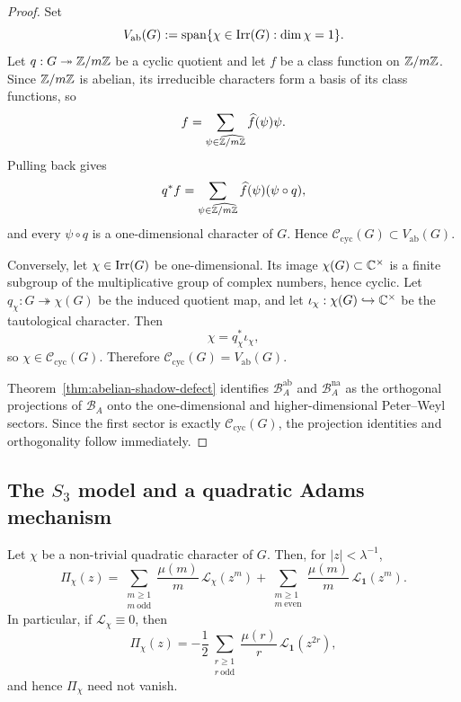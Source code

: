 \begin{proof}
  Set
  \[
    V_{\mathrm{ab}}(G)
    :=
    \operatorname{span}\{\chi\in\operatorname{Irr}(G):\dim\chi=1\}.
  \]
  Let \(q:G\twoheadrightarrow \mathbb{Z}/m\mathbb{Z}\) be a cyclic quotient and let
  \(f\) be a class function on \(\mathbb{Z}/m\mathbb{Z}\). Since \(\mathbb{Z}/m\mathbb{Z}\) is
  abelian, its irreducible characters form a basis of its class
  functions, so
  \[
    f=\sum_{\psi\in\widehat{\mathbb{Z}/m\mathbb{Z}}}\widehat f(\psi)\psi.
  \]
  Pulling back gives
  \[
    q^\ast f
    =
    \sum_{\psi\in\widehat{\mathbb{Z}/m\mathbb{Z}}}
      \widehat f(\psi)(\psi\circ q),
  \]
  and every \(\psi\circ q\) is a one-dimensional character of \(G\).
  Hence \(\mathscr C_{\mathrm{cyc}}(G)\subset V_{\mathrm{ab}}(G)\).

  Conversely, let \(\chi\in\operatorname{Irr}(G)\) be one-dimensional. Its image
  \(\chi(G)\subset\mathbb{C}^\times\) is a finite subgroup of the
  multiplicative group of complex numbers, hence cyclic. Let
  \(q_\chi:G\twoheadrightarrow \chi(G)\) be the induced quotient map,
  and let \(\iota_\chi:\chi(G)\hookrightarrow \mathbb{C}^\times\) be the
  tautological character. Then
  \[
    \chi=q_\chi^\ast\iota_\chi,
  \]
  so \(\chi\in\mathscr C_{\mathrm{cyc}}(G)\). Therefore
  \(\mathscr C_{\mathrm{cyc}}(G)=V_{\mathrm{ab}}(G)\).

  Theorem~\ref{thm:abelian-shadow-defect} identifies
  \(\mathcal B_A^{\mathrm{ab}}\) and \(\mathcal B_A^{\mathrm{na}}\) as
  the orthogonal projections of \(\mathcal B_A\) onto the
  one-dimensional and higher-dimensional Peter--Weyl sectors. Since the
  first sector is exactly \(\mathscr C_{\mathrm{cyc}}(G)\), the
  projection identities and orthogonality follow immediately.
\end{proof}

\subsection{The \texorpdfstring{$S_3$}{S3} model and a quadratic Adams mechanism}

\begin{proposition}
  \label{thm:quadratic-adams-obstruction}
  Let \(\chi\) be a non-trivial quadratic character of \(G\). Then, for
  \(|z|<\lambda^{-1}\),
  \begin{equation}\label{eq:quadratic-adams-obstruction}
    \Pi_\chi(z)
    =
    \sum_{\substack{m\ge 1\\ m\ \mathrm{odd}}}
      \frac{\mu(m)}{m}\,\mathcal L_\chi(z^m)
    +
    \sum_{\substack{m\ge 1\\ m\ \mathrm{even}}}
      \frac{\mu(m)}{m}\,\mathcal L_{\mathbf 1}(z^m).
  \end{equation}
  In particular, if \(\mathcal L_\chi\equiv 0\), then
  \begin{equation}\label{eq:quadratic-adams-obstruction-special}
    \Pi_\chi(z)
    =
    -\frac{1}{2}
      \sum_{\substack{r\ge 1\\ r\ \mathrm{odd}}}
        \frac{\mu(r)}{r}\,
        \mathcal L_{\mathbf 1}(z^{2r}),
  \end{equation}
  and hence \(\Pi_\chi\) need not vanish.
\end{proposition}

